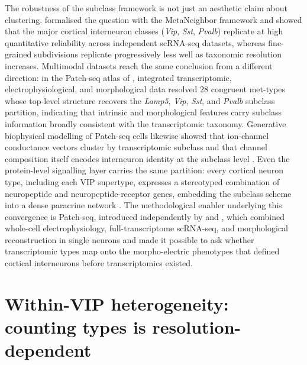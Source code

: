 \documentclass[11pt]{article}
\begin{document}
The robustness of the subclass framework is not just an aesthetic claim about clustering. \citet{Crow2018} formalised the question with the MetaNeighbor framework and showed that the major cortical interneuron classes (\textit{Vip}, \textit{Sst}, \textit{Pvalb}) replicate at high quantitative reliability across independent scRNA-seq datasets, whereas fine-grained subdivisions replicate progressively less well as taxonomic resolution increases. Multimodal datasets reach the same conclusion from a different direction: in the Patch-seq atlas of \citet{Gouwens2020a}, integrated transcriptomic, electrophysiological, and morphological data resolved 28 congruent met-types whose top-level structure recovers the \textit{Lamp5}, \textit{Vip}, \textit{Sst}, and \textit{Pvalb} subclass partition, indicating that intrinsic and morphological features carry subclass information broadly consistent with the transcriptomic taxonomy. Generative biophysical modelling of Patch-seq cells likewise showed that ion-channel conductance vectors cluster by transcriptomic subclass and that channel composition itself encodes interneuron identity at the subclass level \citep{Nandi2022}. Even the protein-level signalling layer carries the same partition: every cortical neuron type, including each VIP supertype, expresses a stereotyped combination of neuropeptide and neuropeptide-receptor genes, embedding the subclass scheme into a dense paracrine network \citep{Smith2019}. The methodological enabler underlying this convergence is Patch-seq, introduced independently by \citet{Cadwell2016} and \citet{Fuzik2016}, which combined whole-cell electrophysiology, full-transcriptome scRNA-seq, and morphological reconstruction in single neurons and made it possible to ask whether transcriptomic types map onto the morpho-electric phenotypes that defined cortical interneurons before transcriptomics existed.

\section{Within-VIP heterogeneity: counting types is resolution-dependent}
\end{document}
